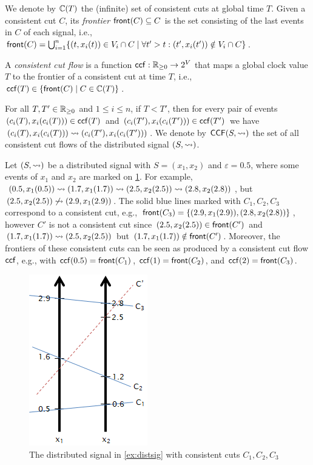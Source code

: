 We denote by $\mathbb{C}(T)$ the (infinite) set of consistent cuts at global time $T$.
Given a consistent cut $C$, its \emph{frontier} $\mathsf{front}(C) \subseteq C$ is the set consisting of the last events in $C$ of each signal, i.e., $\fr(C) = \bigcup_{i = 1}^{n} \{ (t, x_i(t)) \in V_i \cap C \st \forall t' > t : (t', x_i(t')) \notin V_i \cap C \}$.

\begin{definition}
A \emph{consistent cut flow} is a function $\mathsf{ccf} : \mathbb{R}_{\geq 0} \to 2^V$ that maps a global clock value $T$ to the frontier of a consistent cut at time $T$, i.e., $\ccf(T) \in \{\fr(C) \st C \in \CC(T)\}$.
\end{definition}

For all $T,T' \in \mathbb{R}_{\geq 0}$ and $1 \leq i \leq n$, if $T < T'$, then for every pair of events $(c_i(T), x_i(c_i(T))) \in \mathsf{ccf}(T)$ and $(c_i(T'), x_i(c_i(T'))) \in \mathsf{ccf}(T')$ we have $(c_i(T), x_i(c_i(T))) \rightsquigarrow (c_i(T'), x_i(c_i(T')))$.
We denote by $\mathsf{CCF}(S,{\rightsquigarrow})$ the set of all consistent cut flows of the distributed signal $(S,{\rightsquigarrow})$.

\begin{example} \label{ex:distsig}
	Let $(S,{\rightsquigarrow})$ be a distributed signal with $S = (x_1, x_2)$ and $\varepsilon = 0.5$, where some events of $x_1$ and $x_2$ are marked on \cref{fig:distsig}.
	For example, $(0.5, x_1(0.5)) \rightsquigarrow (1.7, x_1(1.7)) \rightsquigarrow (2.5, x_2(2.5)) \rightsquigarrow (2.8, x_2(2.8))$, but $(2.5, x_2(2.5)) \not\rightsquigarrow (2.9, x_1(2.9))$.
	The solid blue lines marked with $C_1, C_2, C_3$ correspond to a consistent cut, e.g., $\mathsf{front}(C_3) = \{(2.9, x_1(2.9)), (2.8, x_2(2.8))\}$, however $C'$ is not a consistent cut since $(2.5, x_2(2.5)) \in \mathsf{front}(C')$ and $(1.7, x_1(1.7)) \rightsquigarrow (2.5, x_2(2.5))$ but $(1.7, x_1(1.7)) \notin \mathsf{front}(C')$.
	Moreover, the frontiers of these consistent cuts can be seen as produced by a consistent cut flow $\mathsf{ccf}$, e.g., with $\mathsf{ccf}(0.5) = \mathsf{front}(C_1)$, $\mathsf{ccf}(1) = \mathsf{front}(C_2)$, and $\mathsf{ccf}(2) = \mathsf{front}(C_3)$.	
\end{example}

\begin{figure}
	\vspace{-2em}
	\begin{center}
		\includegraphics[scale=0.55]{distsig.png}
	\end{center}
	\caption{The distributed signal in \cref{ex:distsig} with consistent cuts $C_1, C_2, C_3$}
	\label{fig:distsig}
\end{figure}

